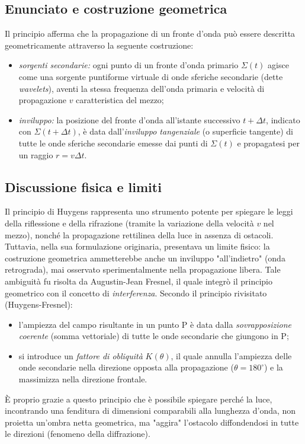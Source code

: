\documentclass[a4paper,11pt]{report}
\begin{document}
\subsection{Enunciato e costruzione geometrica}
Il principio afferma che la propagazione di un fronte d'onda può essere descritta geometricamente attraverso la seguente costruzione:
\begin{itemize}
    \item \textit{sorgenti secondarie:} ogni punto di un fronte d'onda primario $\Sigma(t)$ agisce come una sorgente puntiforme virtuale di onde sferiche secondarie (dette \textit{wavelets}), aventi la stessa frequenza dell'onda primaria e velocità di propagazione $v$ caratteristica del mezzo;
    \item \textit{inviluppo:} la posizione del fronte d'onda all'istante successivo $t + \Delta t$, indicato con $\Sigma(t+\Delta t)$, è data dall'\textit{inviluppo tangenziale} (o superficie tangente) di tutte le onde sferiche secondarie emesse dai punti di $\Sigma(t)$ e propagatesi per un raggio $r = v \Delta t$.
\end{itemize}


\subsection{Discussione fisica e limiti}
Il principio di Huygens rappresenta uno strumento potente per spiegare le leggi della riflessione e della rifrazione (tramite la variazione della velocità $v$ nel mezzo), nonché la propagazione rettilinea della luce in assenza di ostacoli.
Tuttavia, nella sua formulazione originaria, presentava un limite fisico: la costruzione geometrica ammetterebbe anche un inviluppo "all'indietro" (onda retrograda), mai osservato sperimentalmente nella propagazione libera.
Tale ambiguità fu risolta da Augustin-Jean Fresnel, il quale integrò il principio geometrico con il concetto di \textit{interferenza}. Secondo il principio rivisitato (Huygens-Fresnel):
\begin{itemize}
    \item l'ampiezza del campo risultante in un punto P è data dalla \textit{sovrapposizione coerente} (somma vettoriale) di tutte le onde secondarie che giungono in P;
    \item si introduce un \textit{fattore di obliquità} $K(\theta)$, il quale annulla l'ampiezza delle onde secondarie nella direzione opposta alla propagazione ($\theta = 180^\circ$) e la massimizza nella direzione frontale.
\end{itemize}
È proprio grazie a questo principio che è possibile spiegare perché la luce, incontrando una fenditura di dimensioni comparabili alla lunghezza d'onda, non proietta un'ombra netta geometrica, ma "aggira" l'ostacolo diffondendosi in tutte le direzioni (fenomeno della diffrazione).
\end{document}
